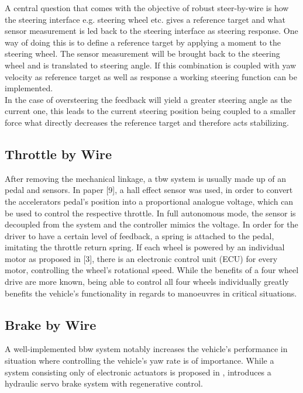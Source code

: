 \documentclass[conference]{IEEEtran}
\begin{document}
A central question that comes with the objective of robust steer-by-wire is how the steering interface e.g. steering wheel etc. gives a reference target and what sensor measurement is led back to the steering interface as steering response. One way of doing this is to define a reference target by applying a moment to the steering wheel. The sensor measurement will be brought back to the steering wheel and is translated to steering angle. If this combination is coupled with yaw velocity as reference 
target as well as response a working steering function can be implemented. \\
In the case of oversteering the feedback will yield a greater steering angle as the current one, this leads to the current steering position being coupled to a smaller force what directly decreases the reference target and therefore acts stabilizing.

\subsection{Throttle by Wire}

After removing the mechanical linkage, a tbw system is usually made up of an pedal and sensors. In paper [9], a hall effect sensor was used, in order to convert the accelerators pedal's position into a proportional analogue voltage, which can be used to control the respective throttle. In full autonomous mode, the sensor is decoupled from the system and the controller mimics the voltage. In order for the driver to have a certain level of feedback, a spring is attached to the pedal, imitating the throttle return spring. If each wheel is powered by an individual motor as proposed in [3], there is an electronic control unit (ECU) for every motor, controlling the wheel's rotational speed. While the benefits of a four wheel drive are more known, being able to control all four wheels individually greatly benefits the vehicle's functionality in regards to manoeuvres in critical situations. 

\subsection{Brake by Wire}

A well-implemented bbw system notably increases the vehicle's performance in situation where controlling the vehicle's yaw rate is of importance. While a system consisting only of electronic actuators is proposed in \cite{Weidong}, \cite{Aoki} introduces a hydraulic servo brake system with regenerative control. 
\end{document}
